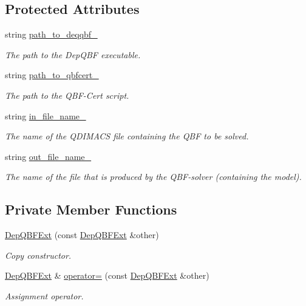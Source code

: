 \subsection*{Protected Attributes}
\begin{DoxyCompactItemize}
\item 
string \hyperlink{classDepQBFExt_a4c952a6d69e93efc5cd6c5491f85c5b3}{path\-\_\-to\-\_\-deqqbf\-\_\-}
\begin{DoxyCompactList}\small\item\em The path to the Dep\-Q\-B\-F executable. \end{DoxyCompactList}\item 
string \hyperlink{classDepQBFExt_a05676410e9b70c5e83cb13b708e2f178}{path\-\_\-to\-\_\-qbfcert\-\_\-}
\begin{DoxyCompactList}\small\item\em The path to the Q\-B\-F-\/\-Cert script. \end{DoxyCompactList}\item 
string \hyperlink{classExtQBFSolver_a04d2ff483c22a11344e46d66ae7e76b1}{in\-\_\-file\-\_\-name\-\_\-}
\begin{DoxyCompactList}\small\item\em The name of the Q\-D\-I\-M\-A\-C\-S file containing the Q\-B\-F to be solved. \end{DoxyCompactList}\item 
string \hyperlink{classExtQBFSolver_a0efb35aa9b807dec521ad3406eaf664d}{out\-\_\-file\-\_\-name\-\_\-}
\begin{DoxyCompactList}\small\item\em The name of the file that is produced by the Q\-B\-F-\/solver (containing the model). \end{DoxyCompactList}\end{DoxyCompactItemize}
\subsection*{Private Member Functions}
\begin{DoxyCompactItemize}
\item 
\hyperlink{classDepQBFExt_ae711230c91a8990450466d085a34bcc2}{Dep\-Q\-B\-F\-Ext} (const \hyperlink{classDepQBFExt}{Dep\-Q\-B\-F\-Ext} \&other)
\begin{DoxyCompactList}\small\item\em Copy constructor. \end{DoxyCompactList}\item 
\hyperlink{classDepQBFExt}{Dep\-Q\-B\-F\-Ext} \& \hyperlink{classDepQBFExt_a25779db93932e28f4f7cbddaa8636fdb}{operator=} (const \hyperlink{classDepQBFExt}{Dep\-Q\-B\-F\-Ext} \&other)
\begin{DoxyCompactList}\small\item\em Assignment operator. \end{DoxyCompactList}\end{DoxyCompactItemize}



